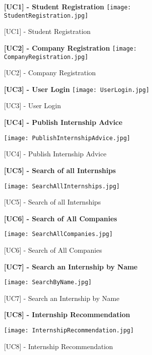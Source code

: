 			\begin{figure}[H]
				\centering
				{\bfseries [UC1] - Student Registration}
				\texttt{[image: StudentRegistration.jpg]}
				\caption{[UC1] - Student Registration}
			\end{figure}
			
			\begin{figure}[H]
				\centering
				{\bfseries [UC2] - Company Registration}
				\texttt{[image: CompanyRegistration.jpg]}
				\caption{[UC2] - Company Registration}
				
			\end{figure}
			
			\begin{figure}[H]
				\centering
				{\bfseries [UC3] - User Login}
				\texttt{[image: UserLogin.jpg]}
				\caption{[UC3] - User Login}
				
			\end{figure}
			
			\begin{figure}[H]
				\centering
				{\bfseries [UC4] - Publish Internship Advice}
				\caption{[UC4] - Publish Internship Advice}
				\texttt{[image: PublishInternshipAdvice.jpg]}
				
				
			\end{figure}
			
		
			\begin{figure}[H]
				\centering
				{\bfseries [UC5] - Search of all Internships}
				\caption{[UC5] - Search of all Internships}
				\texttt{[image: SearchAllInternships.jpg]}
				
			\end{figure}
			
			\begin{figure}[H]
				\centering
				{\bfseries [UC6] - Search of All Companies}
				\caption{[UC6] - Search of All Companies}
				\texttt{[image: SearchAllCompanies.jpg]}
				
			\end{figure}
			
			\begin{figure}[H]
				\centering
				{\bfseries [UC7] - Search an Internship by Name}
				\caption{[UC7] - Search an Internship by Name}
				\texttt{[image: SearchByName.jpg]}
				
			\end{figure}
			
			\begin{figure}[H]
				\centering
				{\bfseries [UC8] - Internship Recommendation}
				\caption{[UC8] - Internship Recommendation}
				\texttt{[image: InternshipRecommendation.jpg]}
				
			\end{figure}
			
